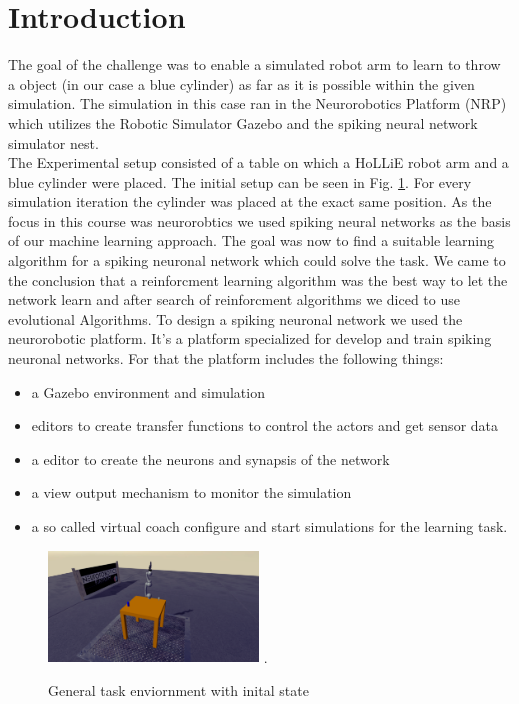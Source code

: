 \section{Introduction}
The goal of the challenge was to enable a simulated robot arm to learn to throw a object (in our case a blue cylinder) as far as it is possible within the given simulation. The simulation in this case ran in the Neurorobotics Platform (NRP) which utilizes the Robotic Simulator Gazebo and the spiking neural network simulator nest.\\
The Experimental setup consisted of a table on which a HoLLiE robot arm and a blue cylinder were placed.
The initial setup can be seen in Fig. \ref{init_state}. For every simulation iteration the cylinder was placed at the exact same position. 
As the focus in this course was neurorobtics we used spiking neural networks as the basis of our machine learning approach.  
The goal was now to find a suitable learning algorithm for a spiking neuronal network which could solve the task. We came to the conclusion that a reinforcment learning algorithm was the best way to let the network learn and after search of reinforcment algorithms we diced to use evolutional Algorithms. 
To design a spiking neuronal network we used the neurorobotic platform. It's a platform specialized for develop and train spiking neuronal networks. For that the platform includes the following things:
 \begin{itemize}
\item a Gazebo environment and simulation
\item editors to create transfer functions to control the actors and get sensor data
\item a editor to create the neurons and synapsis of the network
\item a view output mechanism to monitor the simulation
\item a so called virtual coach configure and start simulations for the learning task.
\end{itemize} 
\begin{figure}[H]
	\centering
	\includegraphics[width=2.2in]{img/init_state.png}
	\DeclareGraphicsExtensions.
	\caption{General task enviornment with inital state }
	\label{init_state}
\end{figure}
